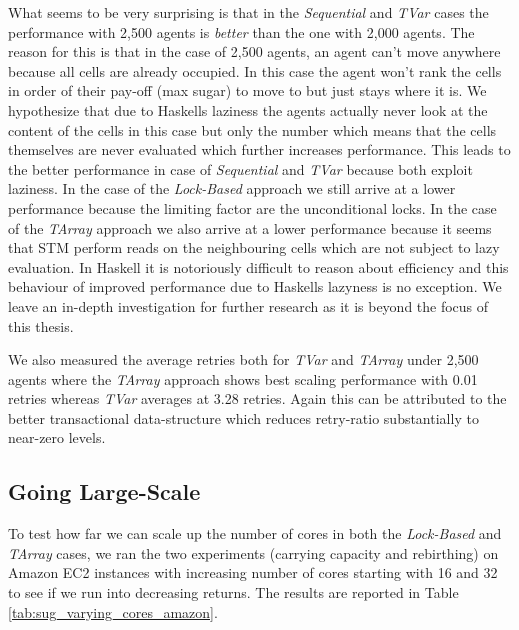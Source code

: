 What seems to be very surprising is that in the \textit{Sequential} and \textit{TVar} cases the performance with 2,500 agents is \textit{better} than the one with 2,000 agents. The reason for this is that in the case of 2,500 agents, an agent can't move anywhere because all cells are already occupied. In this case the agent won't rank the cells in order of their pay-off (max sugar) to move to but just stays where it is. We hypothesize that due to Haskells laziness the agents actually never look at the content of the cells in this case but only the number which means that the cells themselves are never evaluated which further increases performance. This leads to the better performance in case of \textit{Sequential} and \textit{TVar} because both exploit laziness.
In the case of the \textit{Lock-Based} approach we still arrive at a lower performance because the limiting factor are the unconditional locks. In the case of the \textit{TArray} approach we also arrive at a lower performance because it seems that STM perform reads on the neighbouring cells which are not subject to lazy evaluation. In Haskell it is notoriously difficult to reason about efficiency and this behaviour of improved performance due to Haskells lazyness is no exception. We leave an in-depth investigation for further research as it is beyond the focus of this thesis.

We also measured the average retries both for \textit{TVar} and \textit{TArray} under 2,500 agents where the \textit{TArray} approach shows best scaling performance with 0.01 retries whereas \textit{TVar} averages at 3.28 retries. Again this can be attributed to the better transactional data-structure which reduces retry-ratio substantially to near-zero levels.

\subsection{Going Large-Scale}
To test how far we can scale up the number of cores in both the \textit{Lock-Based} and \textit{TArray} cases, we ran the two experiments (carrying capacity and rebirthing) on Amazon EC2 instances with increasing number of cores starting with 16 and 32 to see if we run into decreasing returns. The results are reported in Table \ref{tab:sug_varying_cores_amazon}.

